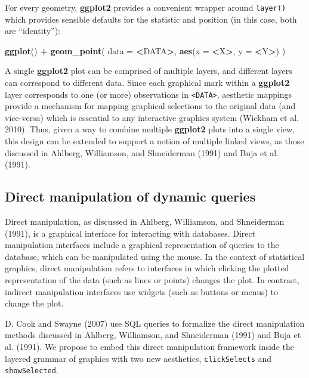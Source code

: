 \documentclass[12pt,]{article}
\newenvironment{Shaded}{\begin{snugshade}}{\end{snugshade}}
\newcommand{\DataTypeTok}[1]{\textcolor[rgb]{0.13,0.29,0.53}{#1}}
\newcommand{\KeywordTok}[1]{\textcolor[rgb]{0.13,0.29,0.53}{\textbf{#1}}}
\newcommand{\NormalTok}[1]{#1}
\newcommand{\OperatorTok}[1]{\textcolor[rgb]{0.81,0.36,0.00}{\textbf{#1}}}
\newcommand{\StringTok}[1]{\textcolor[rgb]{0.31,0.60,0.02}{#1}}
\theoremstyle{definition}
\theoremstyle{definition}
\theoremstyle{definition}
\theoremstyle{remark}
\begin{document}
For every geometry, \textbf{ggplot2} provides a convenient wrapper
around \texttt{layer()} which provides sensible defaults for the
statistic and position (in this case, both are ``identity''):

\begin{Shaded}
\begin{Highlighting}[]
\KeywordTok{ggplot}\NormalTok{() }\OperatorTok{+}\StringTok{ }\KeywordTok{geom_point}\NormalTok{(}
  \DataTypeTok{data =} \OperatorTok{<}\NormalTok{DATA}\OperatorTok{>}\NormalTok{, }
  \KeywordTok{aes}\NormalTok{(}\DataTypeTok{x =} \OperatorTok{<}\NormalTok{X}\OperatorTok{>}\NormalTok{, }\DataTypeTok{y =} \OperatorTok{<}\NormalTok{Y}\OperatorTok{>}\NormalTok{)}
\NormalTok{)}
\end{Highlighting}
\end{Shaded}

A single \textbf{ggplot2} plot can be comprised of multiple layers, and
different layers can correspond to different data. Since each graphical
mark within a \textbf{ggplot2} layer corresponds to one (or more)
observations in \texttt{\textless{}DATA\textgreater{}}, aesthetic
mappings provide a mechanism for mapping graphical selections to the
original data (and vice-versa) which is essential to any interactive
graphics system (Wickham et al. 2010). Thus, given a way to combine
multiple \textbf{ggplot2} plots into a single view, this design can be
extended to support a notion of multiple linked views, as those
discussed in Ahlberg, Williamson, and Shneiderman (1991) and Buja et al.
(1991).

\hypertarget{extension}{%
\subsection{Direct manipulation of dynamic queries}\label{extension}}

Direct manipulation, as discussed in Ahlberg, Williamson, and
Shneiderman (1991), is a graphical interface for interacting with
databases. Direct manipulation interfaces include a graphical
representation of queries to the database, which can be manipulated
using the mouse. In the context of statistical graphics, direct
manipulation refers to interfaces in which clicking the plotted
representation of the data (such as lines or points) changes the plot.
In contrast, indirect manipulation interfaces use widgets (such as
buttons or menus) to change the plot.

D. Cook and Swayne (2007) use SQL queries to formalize the direct
manipulation methods discussed in Ahlberg, Williamson, and Shneiderman
(1991) and Buja et al. (1991). We propose to embed this direct
manipulation framework inside the layered grammar of graphics with two
new aesthetics, \texttt{clickSelects} and \texttt{showSelected}.
\end{document}
